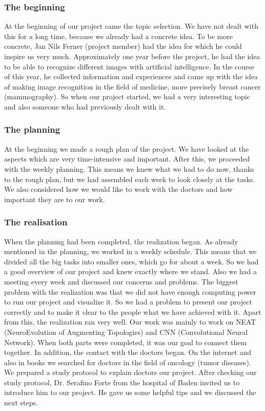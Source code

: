 \subsubsection{The beginning}

At the beginning of our project came the topic selection. 
We have not dealt with this for a long time, because we already had a concrete idea. 
To be more concrete, Jan Nils Ferner (project member) had the idea for which he could inspire us very much.  
Approximately one year before the project, he had the idea to be able to recognize different images with artificial intelligence. 
In the course of this year, he collected information and experiences and came up with the idea of making image recognition in the field of medicine, more precisely breast cancer (mammography). 
So when our project started, we had a very interesting topic and also someone who had previously dealt with it.\\

\subsubsection{The planning}

At the beginning we made a rough plan of the project. 
We have looked at the aspects which are very time-intensive and important. After this, we proceeded with the weekly planning. 
This means we knew what we had to do now, thanks to the rough plan, but we had assembled each week to look closely at the tasks. 
We also considered how we would like to work with the doctors and how important they are to our work.

\subsubsection{The realisation}

When the planning had been completed, the realization began. 
As already mentioned in the planning, we worked in a weekly schedule. 
This means that we divided all the big tasks into smaller ones, which go for about a week. 
So we had a good overview of our project and knew exactly where we stand. 
Also we had a meeting every week and discussed our concerns and problems. 
The biggest problem with the realization was that we did not have enough computing power to run our project and visualize it. 
So we had a problem to present our project correctly and to make it clear to the people what we have achieved with it. 
Apart from this, the realization ran very well.
Our work was mainly to work on NEAT (NeuroEvolution of Augmenting Topologies) and CNN (Convolutional Neural Network). 
When both parts were completed, it was our goal to connect them together. 
In addition, the contact with the doctors began.  
On the internet and also in books we searched for doctors in the field of oncology (tumor diseases). 
We prepared a study protocol to explain doctors our project. 
After checking our study protocol, Dr. Serafino Forte from the hospital of Baden invited us to introduce him to our project. 
He gave us some helpful tips and we discussed the next steps. 

